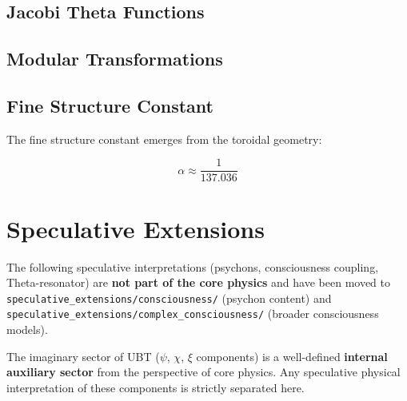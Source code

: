 \documentclass[12pt,a4paper]{article}
\begin{document}

\subsection{Jacobi Theta Functions}


\subsection{Modular Transformations}


\subsection{Fine Structure Constant}

The fine structure constant emerges from the toroidal geometry:

\begin{equation}
\alpha \approx \frac{1}{137.036}
\end{equation}



\section{Speculative Extensions}
\label{sec:speculative_extensions}

\begin{tcolorbox}[colback=red!5!white,colframe=red!75!black,title=Note: Speculative Content Quarantined]
The following speculative interpretations (psychons, consciousness coupling, Theta-resonator)
are \textbf{not part of the core physics} and have been moved to
\texttt{speculative\_extensions/consciousness/} (psychon content) and
\texttt{speculative\_extensions/complex\_consciousness/} (broader consciousness models).

The imaginary sector of UBT ($\psi$, $\chi$, $\xi$ components) is a well-defined
\textbf{internal auxiliary sector} from the perspective of core physics.
Any speculative physical interpretation of these components is strictly separated here.
\end{tcolorbox}
\end{document}
